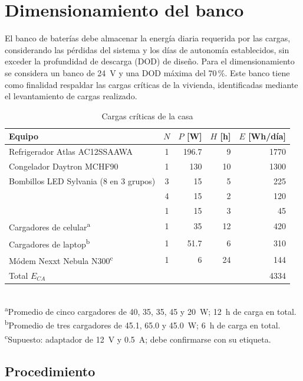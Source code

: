 \section{Dimensionamiento del banco}\label{sec:dimensionamiento}

El banco de baterías debe almacenar la energía diaria requerida por las cargas, considerando las pérdidas del sistema y los días de autonomía establecidos, sin exceder la profundidad de descarga (DOD) de diseño. Para el dimensionamiento se considera un banco de \SI{24}{V} y una DOD máxima del 70\,\%. Este banco tiene como finalidad respaldar las cargas críticas de la vivienda, identificadas mediante el levantamiento de cargas realizado.

\begin{table}[!ht]
\caption{Cargas críticas de la casa}
\label{tab:cargas}
\centering
\footnotesize
\setlength{\tabcolsep}{3pt}
\begin{tabular}{>{\raggedright\arraybackslash}p{} c r r r}
\toprule
Equipo & $N$ & $P$ [W] & $H$ [h] & $E$ [Wh/día] \\
\midrule
Refrigerador Atlas AC12SSAAWA & 1 & 196.7 & 9 & 1770 \\
Congelador Daytron MCHF90 & 1 & 130 & 10 & 1300 \\
Bombillos LED Sylvania (8 en 3 grupos) & 3 & 15 & 5 & 225 \\
 & 4 & 15 & 2 & 120 \\
 & 1 & 15 & 3 & 45 \\
Cargadores de celular\textsuperscript{a} & 1 & 35 & 12 & 420 \\
Cargadores de laptop\textsuperscript{b} & 1 & 51.7 & 6 & 310 \\
Módem Nexxt Nebula N300\textsuperscript{c} & 1 & 6 & 24 & 144 \\
\midrule
Total $E_{CA}$ & & & & 4334 \\
\bottomrule
\end{tabular}
\\[2pt]
{\footnotesize \textsuperscript{a}Promedio de cinco cargadores de 40, 35, 35, 45 y \SI{20}{W}; \SI{12}{h} de carga en total. \textsuperscript{b}Promedio de tres cargadores de 45.1, 65.0 y \SI{45.0}{W}; \SI{6}{h} de carga en total. \textsuperscript{c}Supuesto: adaptador de \SI{12}{V} y \SI{0.5}{A}; debe confirmarse con su etiqueta.}
\end{table}

\subsection{Procedimiento}

